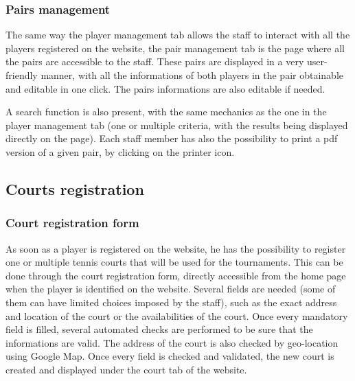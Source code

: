 \subsubsection{Pairs management}
\label{subs:Pairs management}


The same way the player management tab allows the staff to interact with all
the players registered on the website, the pair management tab is the page
where all the pairs are accessible to the staff. These pairs are displayed in a
very user-friendly manner, with all the informations of both players in the
pair obtainable and editable in one click. The pairs informations are also
editable if needed. \newline

A search function is also present, with the same mechanics as the one in the
player management tab (one or multiple criteria, with the results being
displayed directly on the page). Each staff member has also the possibility to
print a pdf version of a given pair, by clicking on the printer icon.

\subsection{Courts registration}
\label{sub:Courts registration}

\subsubsection{Court registration form}
\label{subs:Court registration form}


As soon as a player is registered on the website, he has the possibility to
register one or multiple tennis courts that will be used for the tournaments.
This can be done through the court registration form, directly accessible from
the home page when the player is identified on the website. Several fields are
needed (some of them can have limited choices imposed by the staff), such as
the exact address and location of the court or the availabilities of the court.
Once every mandatory field is filled, several automated checks are performed to
be sure that the informations are valid. The address of the court is also
checked by geo-location using Google Map. Once every field is checked and
validated, the new court is created and displayed under the court tab of the
website.

